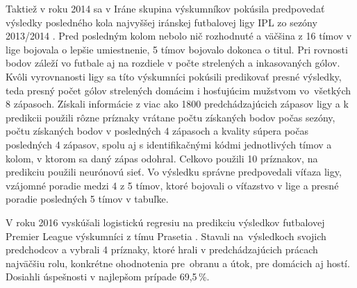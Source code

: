 Taktiež v roku 2014 sa v Iráne skupina výskumníkov pokúsila predpovedať výsledky posledného kola najvyššej iránskej futbalovej ligy IPL zo sezóny 2013/2014 \citep{related:iran}.
Pred posledným kolom nebolo nič rozhodnuté a väčšina z 16 tímov v lige bojovala o lepšie umiestnenie, 5 tímov bojovalo dokonca o titul.
Pri rovnosti bodov záleží vo futbale aj na rozdiele v počte strelených a inkasovaných gólov. 
Kvôli vyrovnanosti ligy sa títo výskumníci pokúsili predikovať presné výsledky, teda presný počet gólov strelených domácim i hosťujúcim mužstvom vo~všetkých 8 zápasoch.
Získali informácie z viac ako 1800 predchádzajúcich zápasov ligy a k predikcii použili rôzne príznaky vrátane počtu získaných bodov počas sezóny, počtu získaných bodov v posledných 4 zápasoch a kvality súpera počas posledných 4 zápasov, spolu aj s identifikačnými kódmi jednotlivých tímov a kolom, v ktorom sa daný zápas odohral.
Celkovo použili 10 príznakov, na predikciu použili neurónovú sieť.
Vo výsledku správne predpovedali víťaza ligy, vzájomné poradie medzi 4 z 5 tímov, ktoré bojovali o víťazstvo v lige a presné poradie posledných 5 tímov v tabuľke.

V roku 2016 vyskúšali logistickú regresiu na predikciu výsledkov futbalovej Premier League výskumníci z tímu Prasetia \citep{related:prasetio}. 
Stavali na~výsledkoch svojich predchodcov a vybrali 4 príznaky, ktoré hrali v predchádzajúcich prácach najväčšiu rolu, konkrétne ohodnotenia pre~obranu a útok, pre domácich aj hostí.
Dosiahli úspešnosti v najlepšom prípade 69,5\,\%.